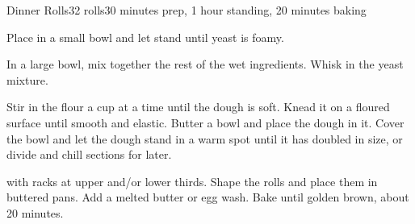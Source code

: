 \documentclass[../Cookbook.tex]{subfiles}
\begin{document}
\begin{recipe}[DinnerRolls]{Dinner Rolls}{32 rolls}{30 minutes prep, 1 hour standing, 20 minutes baking}

Place in a small bowl and let stand until yeast is foamy.

In a large bowl, mix together the rest of the wet ingredients. Whisk in the yeast mixture.

Stir in the flour a cup at a time until the dough is soft. Knead it on a floured surface until smooth and elastic. Butter a bowl and place the dough in it. Cover the bowl and let the dough stand in a warm spot until it has doubled in size, or divide and chill sections for later.

\newstep
{} with racks at upper and/or lower thirds. Shape the rolls and place them in buttered pans. Add a melted butter or egg wash. Bake until golden brown, about 20 minutes.

\end{recipe}
\end{document}
